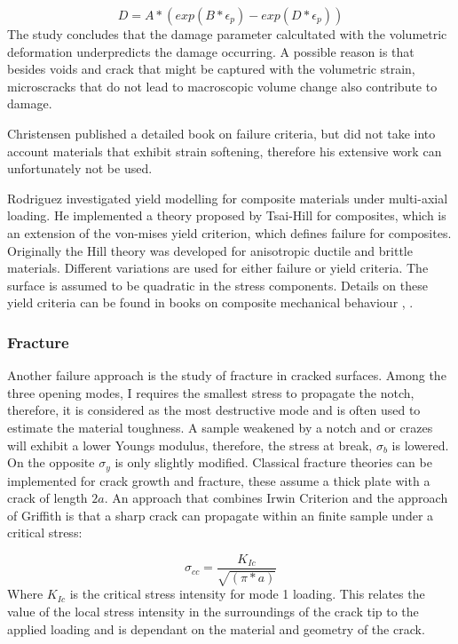 \begin{equation}\label{AzziTsai}
D=A*(exp(B*\epsilon_p)-exp(D*\epsilon_p))
\end{equation}The study concludes that the damage parameter calcultated with the volumetric deformation underpredicts the damage occurring. A possible reason is that besides voids and crack that might be captured with the volumetric strain, microscracks that do not lead to macroscopic volume change also contribute to damage. 

Christensen \cite{Christensen2013TheFailure}  published a detailed book on failure criteria, but did not take into account materials that exhibit strain softening, therefore his extensive work can unfortunately not be used. 

Rodriguez \cite{Rodriguez2003MechanicalModeling} investigated yield modelling for composite materials under multi-axial loading. He implemented a theory proposed by Tsai-Hill for composites, which is an extension of the von-mises yield criterion, which defines failure for composites. Originally the Hill theory was developed for anisotropic ductile and brittle materials. Different variations are used for either failure or yield criteria. The  surface is assumed to be quadratic in the stress components. Details on these yield criteria can be found in books on composite mechanical behaviour \cite{Ishai2006EngineeringMaterials}, \cite{Mallick2007Fiber-Composites}.

\subsubsection{Fracture}
Another failure approach is the study of fracture in cracked surfaces. Among the three opening modes, I requires the smallest stress to propagate the notch, therefore, it is considered as the most destructive mode and is often used to estimate the material toughness. A sample weakened by a notch and or crazes will exhibit a lower Youngs modulus, therefore, the stress at break, $\sigma_b$ is lowered. On the opposite $\sigma_y$ is only slightly modified. Classical fracture theories can be implemented for crack growth and fracture, these assume a thick plate with a crack of length $2a$. An approach that combines Irwin Criterion and  the approach of Griffith is that a sharp crack can propagate within an finite sample under a critical stress:

\begin{equation} \label{eqn:criticalstress}
 \sigma_{cc}=\frac{K_{Ic}}{\sqrt{(\pi*a)}}
\end{equation}
Where $K_{Ic}$ is the critical stress intensity for mode 1 loading. This relates the value of the local stress intensity in the surroundings of the crack tip to the applied loading and is dependant on the material and geometry of the crack. 

